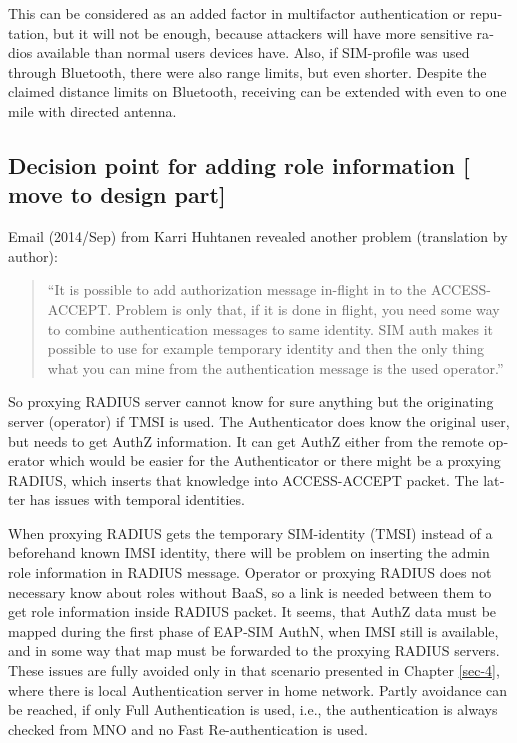 \documentclass[12pt,a4paper,english]{tutthesis}
\begin{document}
\begin{otherlanguage}{english}
This can be considered as an added factor in multifactor
authentication or reputation, but it will not be enough, because
attackers will have more sensitive  radios available than normal users
devices have. 
Also, if SIM-profile was used through Bluetooth, there were also
range limits, but even shorter. Despite the claimed distance limits
on Bluetooth, receiving can be extended with even to one mile with
directed antenna\cite{SANS-bluetooth-2007}.


\subsection{Decision point for adding role information [ move to design part]}
\label{sec-6-4-8}













Email (2014/Sep) from Karri Huhtanen revealed another
problem (translation by author):
\begin{quote}
``It is possible to add authorization message in-flight in to the
ACCESS-ACCEPT.
Problem is only that, if it is done in flight, you need some way to
combine authentication messages to same identity. SIM auth makes it
possible to use for example temporary identity and then the only thing
what you can mine from the authentication message is the used operator.''
\end{quote}

So proxying RADIUS server cannot know for sure anything but the
originating server (operator) if TMSI is used. The Authenticator does
know the original user, but needs to get AuthZ information. It can get
AuthZ either from the remote operator which would be easier for the
Authenticator or there might be a proxying RADIUS, which inserts that
knowledge into ACCESS-ACCEPT packet. The latter has issues with
temporal identities. 






When proxying RADIUS gets the temporary SIM-identity (TMSI) instead of
a beforehand known IMSI identity, there will be problem
on inserting the admin role information in RADIUS message.
Operator or proxying RADIUS 
does not necessary know about roles without BaaS, so a link
is needed between them to get role information inside RADIUS packet.
It seems, that AuthZ data must be mapped during the first phase of
EAP-SIM AuthN, when IMSI still is available, and in some way
that map must be forwarded to the proxying RADIUS servers.
These issues are fully avoided only in that scenario presented in Chapter
\ref{sec-4}, where there is local Authentication server in home network.
Partly avoidance can be reached, if only Full Authentication is
used, i.e., the authentication is always checked from MNO and no Fast
Re-authentication is used.


\end{otherlanguage}
\end{document}
